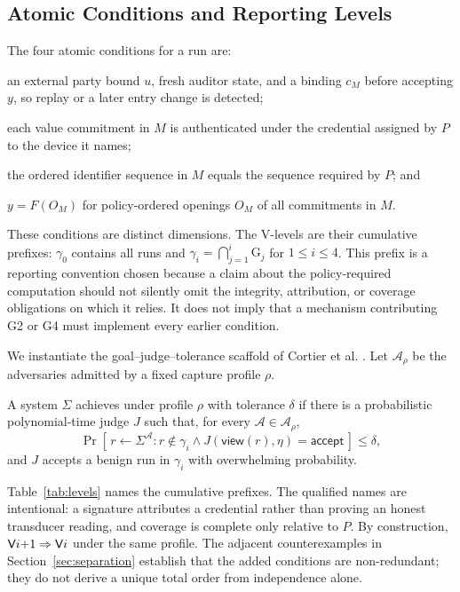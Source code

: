 \subsection{Atomic Conditions and Reporting Levels}
\label{sec:levels}

The four atomic conditions for a run are:
\begin{description}
\setlength{\itemsep}{0pt}
\item[G1 (anchored integrity)] an external party bound $u$, fresh auditor state,
and a binding $c_M$ before accepting $y$, so replay or a later entry change is detected;
\item[G2 (credential attribution)] each value commitment in $M$ is
authenticated under the credential assigned by $P$ to the device it names;
\item[G3 (policy-relative coverage)] the ordered identifier sequence in $M$
equals the sequence required by $P$; and
\item[G4 (computation conformance)] $y=F(O_M)$ for policy-ordered openings
$O_M$ of all commitments in $M$.
\end{description}
These conditions are distinct dimensions. The V-levels are their cumulative
prefixes: $\gamma_0$ contains all runs and
$\gamma_i=\bigcap_{j=1}^{i}\mathrm{G}_j$ for $1\leq i\leq4$. This prefix is a
reporting convention chosen because a claim about the policy-required
computation should not silently omit the integrity, attribution, or coverage
obligations on which it relies. It does not imply that a mechanism contributing
G2 or G4 must implement every earlier condition.

We instantiate the goal--judge--tolerance scaffold of Cortier et al.
\cite{cortier2016}. Let $\mathcal{A}_{\rho}$ be the adversaries admitted by a
fixed capture profile $\rho$.

\begin{definition}
A system $\Sigma$ achieves \textbf{} under profile $\rho$ with
tolerance $\delta$ if there is a probabilistic polynomial-time judge $J$ such
that, for every $\mathcal{A}\in\mathcal{A}_{\rho}$,
\[
\Pr[\, r \leftarrow \Sigma^{\mathcal{A}} :
r \notin \gamma_i \wedge J(\mathsf{view}(r),\eta)=\mathsf{accept}\,]\leq\delta,
\]
and $J$ accepts a benign run in $\gamma_i$ with overwhelming probability.
\end{definition}

Table~\ref{tab:levels} names the cumulative prefixes. The qualified names are
intentional: a signature attributes a credential rather than proving an honest
transducer reading, and coverage is complete only relative to $P$. By
construction, $\textsf{V$i{+}1$}\Rightarrow\textsf{V$i$}$ under the same profile.
The adjacent counterexamples in Section~\ref{sec:separation} establish that the
added conditions are non-redundant; they do not derive a unique total order from
independence alone.


